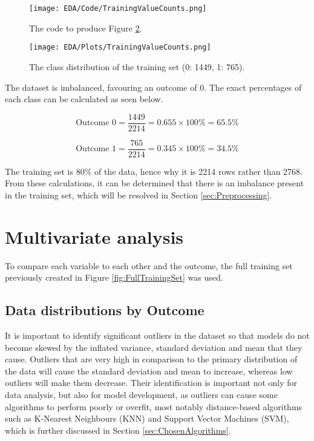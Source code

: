 \begin{figure}[H]
    \centering
    \texttt{[image: EDA/Code/TrainingValueCounts.png]}
    \caption{The code to produce Figure \ref{fig:ClassImbalancePlot}.}
    \label{fig:ClassImbalancePlotCode}
\end{figure}

\begin{figure}[H]
    \centering
    \texttt{[image: EDA/Plots/TrainingValueCounts.png]}
    \caption{The class distribution of the training set (0: 1449, 1: 765).}
    \label{fig:ClassImbalancePlot}
\end{figure}

\para The dataset is imbalanced, favouring an outcome of 0. The exact percentages 
of each class can be calculated as seen below.

\begin{equation}
    \text{Outcome 0} = \frac{1449}{2214} = 0.655 \times 100\% = 65.5\%
\end{equation}

\begin{equation}
    \text{Outcome 1} = \frac{765}{2214} = 0.345 \times 100\% = 34.5\%
\end{equation}

\para The training set is 80\% of the data, hence why it is 2214 rows rather than 2768. From these calculations, it can be determined that 
there is an imbalance present in the training set, which will be resolved in Section \ref{sec:Preprocessing}.



\section{Multivariate analysis}
To compare each variable to each other and the outcome, the full training set previously  
created in Figure \ref{fig:FullTrainingSet} was used.

\subsection{Data distributions by Outcome}

It is important to identify significant outliers in the dataset so that models do not become skewed by the inflated variance, standard 
deviation and mean that they cause. Outliers that are very high in comparison to the primary distribution of the data will cause the 
standard deviation and mean to increase, whereas low outliers will make them decrease. Their identification is important not only for data analysis, 
but also for model development, as outliers can cause some algorithms to perform poorly or overfit, most notably distance-based algorithms 
such as K-Nearest Neighbours (KNN) and Support Vector Machines (SVM), which is further discussed in Section \ref{sec:ChosenAlgorithms}. 

